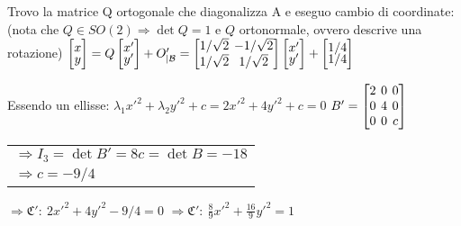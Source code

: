 Trovo la matrice Q ortogonale che diagonalizza A e eseguo cambio di coordinate:
(nota che $Q \in SO(2) \Rightarrow \det Q = 1$ e $Q$ ortonormale, ovvero descrive una rotazione)
$
\begin{bmatrix}
	x \\[-0.3em]
	y \\
\end{bmatrix}
= Q
\begin{bmatrix}
	x' \\[-0.3em]
	y' \\
\end{bmatrix}
+ O'_{|\Base} = 
\left[
	\arraycolsep=2.0pt\def\arraystretch{1.0}
	\begin{array}{@{}cc@{}}
		1/\sqrt{2} & -1/\sqrt{2} \\
		1/\sqrt{2} & 1/\sqrt{2}
	\end{array}
\right]
\begin{bmatrix}
	x' \\[-0.3em]
	y' \\
\end{bmatrix}
+
\begin{bmatrix}
	1/4 \\[-0.3em]
	1/4 \\
\end{bmatrix}
$

Essendo un ellisse: $\lambda_1x'^2 + \lambda_2y'^2 + c = 2x'^2 + 4y'^2 + c = 0$
$
B' = \left[
	\arraycolsep=2.0pt\def\arraystretch{1.0}
	\begin{array}{@{}ccc@{}}
		2 & 0 & 0 \\
		0 & 4 & 0 \\
		0 & 0 & c \\
	\end{array}
\right]
$
\begin{tabular}{l}
	$\Rightarrow I_3 = \det B' = 8c = \det B = -18$ \\
	$\Rightarrow c = -9/4$
\end{tabular}
$\Rightarrow \mathfrak{C'}:\ 2x'^2 + 4y'^2 -9/4 = 0$
$\Rightarrow \mathfrak{C'}:\ \frac{8}{9}x'^2 + \frac{16}{9}y'^2 = 1$
